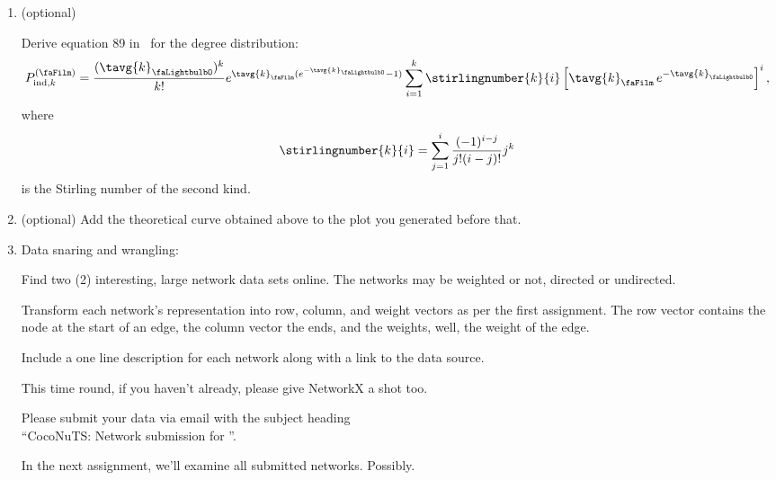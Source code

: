 \begin{enumerate}
  
   \solutionstart


   \solutionend

\item (optional)
  
  Derive equation 89 in~\cite{newman2001b} for the
  degree distribution:
  $$
  \Prboneind
  =
  \frac{
    (\tavg{k}_{\rbtwo})^{k}
  }
  {
    k!
  }
  e^{\tavg{k}_{\rbone}(e^{-\tavg{k}_{\rbtwo}}-1)}
  \sum_{i=1}^{k}
  \stirlingnumber{k}{i}
  \left[
    \tavg{k}_{\rbone} \, e^{-\tavg{k}_{\rbtwo}}
  \right]^{i},
  $$
  where
  $$
  \stirlingnumber{k}{i}
  =
  \sum_{j=1}^{i}
  \frac{(-1)^{i-j}}
  {j!(i-j)!}
  j^{k}
  $$
  is the Stirling number of the second kind.
  

   \solutionstart


   \solutionend


\item (optional)
  Add the theoretical curve obtained above to the plot you generated before that.

  
   \solutionstart


   \solutionend




\item 
  Data snaring and wrangling:

  Find two (2) interesting, large network data sets online.
  The networks may be weighted or not, directed or undirected.

  Transform each network's representation 
  into row, column, and weight vectors
  as per the first assignment. The row vector contains
  the node at the start of an edge, the column vector
  the ends, and the weights, well, the weight of the edge.

  Include a one line description for each network
  along with a link to the data source.
  
  This time round, if you haven't already, please give NetworkX a shot too.

  Please submit your data via email with the subject heading \\
  ``CocoNuTS: Network submission for \codename''.

  In the next assignment, we'll examine all submitted networks.
  Possibly.
  

  
   \solutionstart


\end{enumerate}
